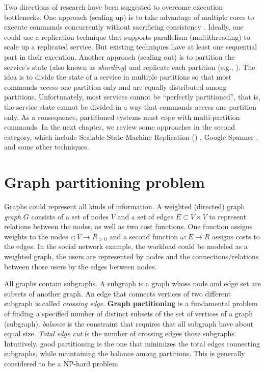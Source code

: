 Two directions of research have been suggested to overcome execution
bottlenecks. One approach (scaling up) is to take advantage of multiple cores to
execute commands concurrently without sacrificing consistency
\cite{Kapritsos:2012um,Marandi:2014bj,Kotla:2004ep,Guo:2014jp}. Ideally, one
could use a replication technique that supports parallelism (multithreading) to
scale up a replicated service. But existing techniques have at least one
sequential part in their execution. Another approach (scaling out) is to
partition the service's state (also known as \emph{sharding}) and replicate each
partition (e.g., \cite{Glendenning:2011kj,Marandi:2011dj}). The idea is to
divide the state of a service in multiple partitions so that most commands
access one partition only and are equally distributed among partitions.
Unfortunately, most services cannot be “perfectly partitioned”, that is, the
service state cannot be divided in a way that commands access one partition
only. As a consequence, partitioned systems must cope with multi-partition
commands. In the next chapter, we review some approaches in the second category,
which include Scalable State Machine Replication (\ssmr) \cite{bezerra2014ssmr},
Google Spanner \cite{corbett2013spanner}, and some other techniques.


\section{Graph partitioning problem}

Graphs could represent all kinds of information.  A weighted (directed) graph
\emph{graph} $G$ consists of a set of nodes $V$ and a set of edges $E \subset V
\times V$ to represent relations between the nodes, as well as two cost
functions. One function assigns weights to the nodes $c : V \rightarrow R_{>0}$
and a second function $\omega : E \rightarrow R$ assigns costs to the edges. In
the social network example, the workload could be modeled as a weighted graph,
the users are represented by nodes and the connections/relations between those
users by the edges between nodes.

All graphs contain subgraphs. A subgraph is a graph whose node and edge set are
subsets of another graph. An edge that connects vertices of two different
subgraph is called \emph{crossing edge}. \textbf{Graph partitioning} is a
fundamental problem of finding a specified number of distinct subsets of the set
of vertices of a graph (subgraph). \emph{balance} is the constraint that
requires that all subgraph have about equal size. \emph{Total edge cut} is the
number of crossing edges those subgraphs. Intuitively, good partitioning is the
one that minimizes the total edges connecting subgraphs, while maintaining the
balance among partitions. This is generally considered to be a NP-hard problem
\cite{10.1006/jpdc.1997.1404}

